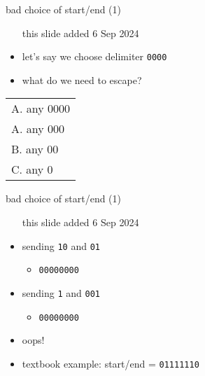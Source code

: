 \begin{frame}{bad choice of start/end (1)}
    \begin{itemize}
    \item [this slide added 6 Sep 2024]
    \item let's say we choose delimiter \texttt{0000}
    \item what do we need to escape?
    \end{itemize}
\begin{tabular}{l}
A. any 0000 \\
A. any 000 \\
B. any 00 \\
C. any 0 \\
\end{tabular}
\end{frame}

\begin{frame}{bad choice of start/end (1)}
    \begin{itemize}
    \item [this slide added 6 Sep 2024]
    \item sending \texttt{10} and \texttt{01}
        \begin{itemize}
        \item {\tt {}00000000}
        \end{itemize}
    \item sending \texttt{1} and \texttt{001}
        \begin{itemize}
        \item {\tt {}00000000}
        \end{itemize}
    \vspace{.5cm}
    \item oops!
    \item textbook example: start/end = {\tt 01111110}
    \end{itemize}
\end{frame}

